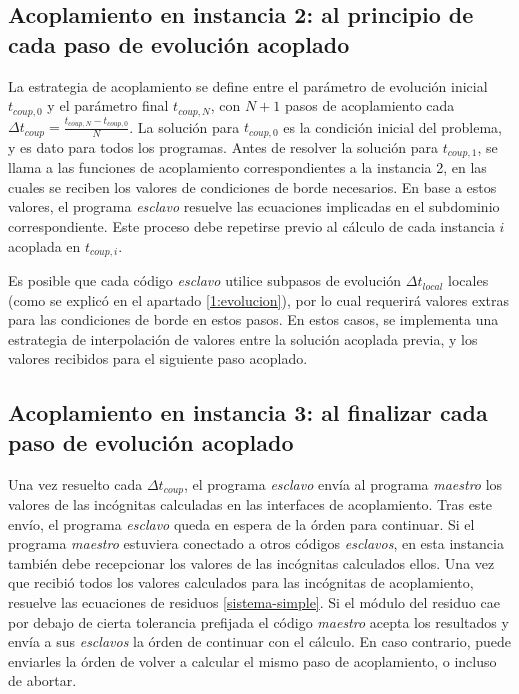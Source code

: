 \subsection*{Acoplamiento en instancia 2: al principio de cada paso de evolución acoplado}

La estrategia de acoplamiento se define entre el parámetro de evolución inicial $t_{coup,0}$ y el parámetro final $t_{coup,N}$,
con $N+1$ pasos de acoplamiento cada $\Delta t_{coup}=\frac{t_{coup,N} - t_{coup,0}}{N}$.
La solución para $t_{coup,0}$ es la condición inicial del problema, y es dato para todos los programas.
Antes de resolver la solución para $t_{coup,1}$, se llama a las funciones de acoplamiento correspondientes a la instancia 2,
en las cuales se reciben los valores de condiciones de borde necesarios.
En base a estos valores, el programa \textit{esclavo} resuelve las ecuaciones implicadas en el subdominio correspondiente.
Este proceso debe repetirse previo al cálculo de cada instancia $i$ acoplada en $t_{coup,i}$.

Es posible que cada código \textit{esclavo} utilice subpasos de evolución $\Delta t_{local}$ locales
(como se explicó en el apartado \ref{1:evolucion}),
por lo cual requerirá valores extras para las condiciones de borde en estos pasos. 
En estos casos, se implementa una estrategia de interpolación de valores entre la solución acoplada previa, y los valores recibidos para el siguiente paso acoplado.


\subsection*{Acoplamiento en instancia 3: al finalizar cada paso de evolución acoplado}

Una vez resuelto cada $\Delta t_{coup}$, el programa \textit{esclavo} envía al programa \textit{maestro} los valores de las incógnitas calculadas en las interfaces de acoplamiento.
Tras este envío, el programa \textit{esclavo} queda en espera de la órden para continuar.
Si el programa \textit{maestro} estuviera conectado a otros códigos \textit{esclavos},
en esta instancia también debe recepcionar los valores de las incógnitas calculados ellos.
Una vez que recibió todos los valores calculados para las incógnitas de acoplamiento,
resuelve las ecuaciones de residuos \ref{sistema-simple}.
Si el módulo del residuo cae por debajo de cierta tolerancia prefijada el código \textit{maestro} acepta los resultados y envía a sus \textit{esclavos} la órden de continuar con el cálculo.
En caso contrario, puede enviarles la órden de volver a calcular el mismo paso de acoplamiento, o incluso de abortar.


